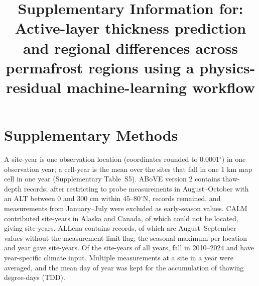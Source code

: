 \documentclass[pdflatex,sn-nature]{sn-jnl}
\begin{document}
\title{Supplementary Information for: Active-layer thickness prediction and regional differences across permafrost regions using a physics-residual machine-learning workflow}
\author[1]{ }
\maketitle

\section{Supplementary Methods}

A site-year is one observation location (coordinates rounded to 0.0001$^\circ$) in one observation year; a cell-year is the mean over the sites that fall in one 1 km map cell in one year (Supplementary Table~S5). ABoVE version 2\cite{Moore2025} contains \nqcAboveRaw{} thaw-depth records; after restricting to probe measurements in August--October with an ALT between 0 and 300 cm within 45--80$^\circ$N, \nqcAboveKept{} records remained, and \nqcAboveEarly{} measurements from January--July were excluded as early-season values. CALM\cite{Streletskiy2025} contributed \nqcCalmSy{} site-years in Alaska and Canada, of which \nqcCalmNoloc{} could not be located, giving \nqcCalmCy{} site-years. ALLena\cite{Veremeeva2025} contains \nqcLenaRaw{} records, of which \nqcLenaEos{} are August--September values without the measurement-limit flag; the seasonal maximum per location and year gave \nqcLenaCy{} site-years. Of the \nqcTotalCy{} site-years of all years, \nqcTotalCyIn{} fall in 2010--2024 and have year-specific climate input. Multiple measurements at a site in a year were averaged, and the mean day of year was kept for the accumulation of thawing degree-days (TDD).
\end{document}
